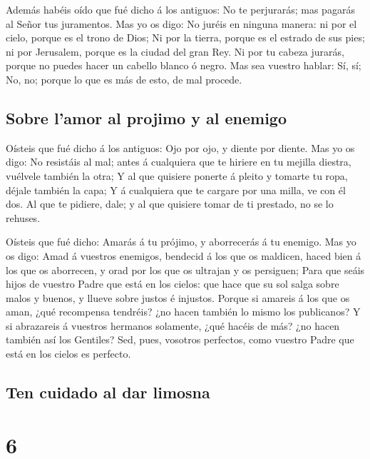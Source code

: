  Además habéis oído que fué dicho á los antiguos: No te
perjurarás; mas pagarás al Señor tus juramentos.  Mas yo
os digo: No juréis en ninguna manera: ni por el cielo, porque es el
trono de Dios;  Ni por la tierra, porque es el estrado de
sus pies; ni por Jerusalem, porque es la ciudad del gran Rey.
 Ni por tu cabeza jurarás, porque no puedes hacer un
cabello blanco ó negro.  Mas sea vuestro hablar: Sí, sí;
No, no; porque lo que es más de esto, de mal procede.

\hypertarget{sobre-lamor-al-projimo-y-al-enemigo}{%
\subsection{Sobre l'amor al projimo y al
enemigo}\label{sobre-lamor-al-projimo-y-al-enemigo}}

 Oísteis que fué dicho á los antiguos: Ojo por ojo, y
diente por diente.  Mas yo os digo: No resistáis al mal;
antes á cualquiera que te hiriere en tu mejilla diestra, vuélvele
también la otra;  Y al que quisiere ponerte á pleito y
tomarte tu ropa, déjale también la capa;  Y á cualquiera
que te cargare por una milla, ve con él dos.  Al que te
pidiere, dale; y al que quisiere tomar de ti prestado, no se lo rehuses.

 Oísteis que fué dicho: Amarás á tu prójimo, y
aborrecerás á tu enemigo.  Mas yo os digo: Amad á
vuestros enemigos, bendecid á los que os maldicen, haced bien á los que
os aborrecen, y orad por los que os ultrajan y os persiguen;
 Para que seáis hijos de vuestro Padre que está en los
cielos: que hace que su sol salga sobre malos y buenos, y llueve sobre
justos é injustos.  Porque si amareis á los que os aman,
¿qué recompensa tendréis? ¿no hacen también lo mismo los publicanos?
 Y si abrazareis á vuestros hermanos solamente, ¿qué
hacéis de más? ¿no hacen también así los Gentiles?  Sed,
pues, vosotros perfectos, como vuestro Padre que está en los cielos es
perfecto.

\hypertarget{ten-cuidado-al-dar-limosna}{%
\subsection{Ten cuidado al dar
limosna}\label{ten-cuidado-al-dar-limosna}}

\hypertarget{section-5}{%
\section{6}\label{section-5}}

